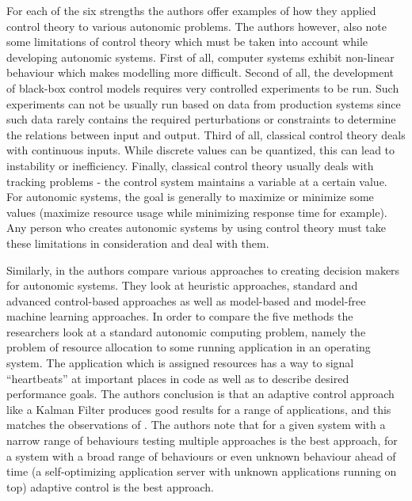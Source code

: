 For each of the six strengths the authors offer examples of how they applied control theory to various autonomic problems. The authors however, also note some limitations of control theory which must be taken into account while developing autonomic systems. First of all, computer systems exhibit non-linear behaviour which makes modelling more difficult. Second of all, the development of black-box control models requires very controlled experiments to be run. Such experiments can not be usually run based on data from production systems since such data rarely contains the required perturbations or constraints to determine the relations between input and output. Third of all, classical control theory deals with continuous inputs. While discrete values can be quantized, this can lead to instability or inefficiency. Finally, classical control theory usually deals with tracking problems - the control system maintains a variable at a certain value. For autonomic systems, the goal is generally to maximize or minimize some values (maximize resource usage while minimizing response time for example). Any person who creates autonomic systems by using control theory must take these limitations in consideration and deal with them.

Similarly, in \cite{related:control2} the authors compare various approaches to creating decision makers for autonomic systems. They look at heuristic approaches, standard and advanced control-based approaches as well as model-based and model-free machine learning approaches. In order to compare the five methods the researchers look at a standard autonomic computing problem, namely the problem of resource allocation to some running application in an operating system. The application which is assigned resources has a way to signal ``heartbeats'' at important places in code as well as to describe desired performance goals. The authors conclusion is that an adaptive control approach like a Kalman Filter produces good results for a range of applications, and this matches the observations of \cite{related:control}. The authors note that for a given system with a narrow range of behaviours testing multiple approaches is the best approach, for a system with a broad range of behaviours or even unknown behaviour ahead of time (a self-optimizing application server with unknown applications running on top) adaptive control is the best approach.


